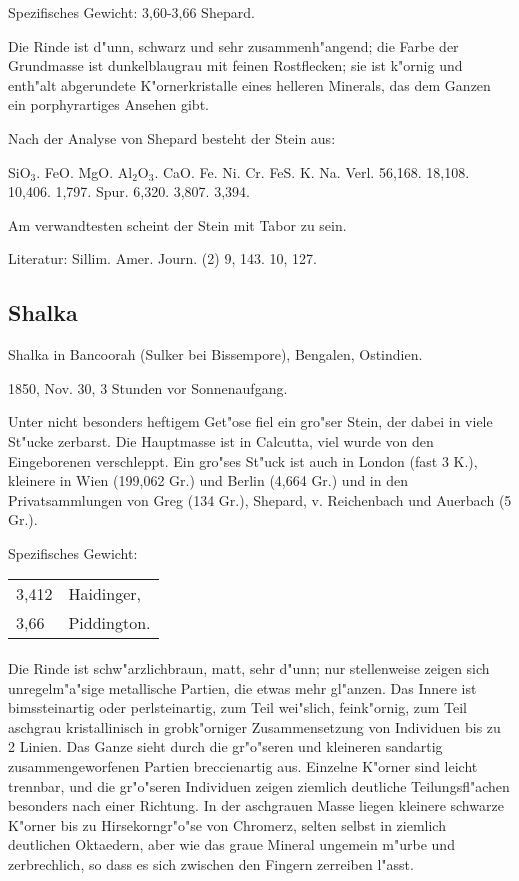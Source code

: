 \documentclass[a4paper, 11pt, oneside]{article}
\begin{document}
Spezifisches Gewicht: 3,60-3,66 Shepard.

Die Rinde ist d"unn, schwarz und sehr zusammenh"angend; die Farbe der Grundmasse ist dunkelblaugrau mit feinen Rostflecken; sie ist k"ornig und enth"alt abgerundete K"ornerkristalle eines helleren Minerals, das dem Ganzen ein porphyrartiges Ansehen gibt.

Nach der Analyse von Shepard besteht der Stein aus:

SiO$_{3}$. FeO. MgO. Al$_{2}$O$_{3}$. CaO. {Fe. Ni. Cr.} FeS. {K. Na. Verl.}  
56,168. 18,108. 10,406. 1,797. Spur. 6,320. 3,807. 3,394.

Am verwandtesten scheint der Stein mit Tabor zu sein.

Literatur: Sillim. Amer. Journ. (2) 9, 143. 10, 127.

\subsection{Shalka}

Shalka in Bancoorah (Sulker bei Bissempore), Bengalen, Ostindien.

1850, Nov. 30, 3 Stunden vor Sonnenaufgang.

Unter nicht besonders heftigem Get"ose fiel ein gro"ser Stein, der dabei in viele St"ucke zerbarst. Die Hauptmasse ist in Calcutta, viel wurde von den Eingeborenen verschleppt. Ein gro"ses St"uck ist auch in London (fast 3 K.), kleinere in Wien (199,062 Gr.) und Berlin (4,664 Gr.) und in den Privatsammlungen von Greg (134 Gr.), Shepard, v. Reichenbach und Auerbach (5 Gr.).

Spezifisches Gewicht:  
\begin{table}[!ht]
    \centering
    \begin{tabular}{l l}
        3,412 & Haidinger,\\
        3,66 & Piddington.
    \end{tabular}
\end{table}
\paragraph{}
Die Rinde ist schw"arzlichbraun, matt, sehr d"unn; nur stellenweise zeigen sich unregelm"a"sige metallische Partien, die etwas mehr gl"anzen. Das Innere ist bimssteinartig oder perlsteinartig, zum Teil wei"slich, feink"ornig, zum Teil aschgrau kristallinisch in grobk"orniger Zusammensetzung von Individuen bis zu 2 Linien. Das Ganze sieht durch die gr"o"seren und kleineren sandartig zusammengeworfenen Partien breccienartig aus. Einzelne K"orner sind leicht trennbar, und die gr"o"seren Individuen zeigen ziemlich deutliche Teilungsfl"achen besonders nach einer Richtung. In der aschgrauen Masse liegen kleinere schwarze K"orner bis zu Hirsekorngr"o"se von Chromerz, selten selbst in ziemlich deutlichen Oktaedern, aber wie das graue Mineral ungemein m"urbe und zerbrechlich, so dass es sich zwischen den Fingern zerreiben l"asst.
\end{document}
